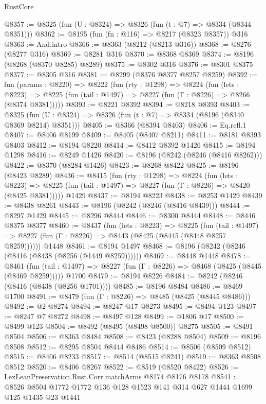 \begin{lexlean}{RustCore}
\begin{coremodule}
@8357 := @8325 (fun (U : @8324) => @8326 (fun (t : @7) => @8334 (@8344 @8351)))
@8362 := @8195 (fun (fn : @116) => @8217 (@8323 @8357)) @316
@8363 := And.intro
@8366 := @8363 (@8212 (@8213 @316))
@8368 := @8276 (@8277 @316)
@8369 := @8281 @316
@8370 := @8368 @8369
@8374 := @8196 (@8268 (@8370 @8285) @8289)
@8375 := @8302 @316
@8376 := @8301 @8375
@8377 := @8305 @316
@8381 := @8299 (@8376 @8377 @8257 @8259)
@8392 := fun (params : @8220) =>
  @8222
    (fun (rty : @1298) =>
    @8224
      (fun (lets : @8223) =>
      @8225 (fun (tail : @1497) => @8227 (fun (Γ : @8226) => @8266 (@8374 @8381)))))
@8393 := @8221 @8392
@8394 := @8218 @8393
@8403 := @8325 (fun (U : @8324) => @8326 (fun (t : @7) => @8334 (@8196 (@8340 @8369 @8214) @8351)))
@8405 := @8366 (@8394 @8403)
@8406 := Eq.refl.{1}
@8407 := @8406 @8199
@8409 := @8405 (@8407 @8211)
@8411 := @8181 @8393 @8403
@8412 := @8194 @8220
@8414 := @8412 @8392 @1426
@8415 := @8194 @1298
@8416 := @8249 @1426
@8420 := @8196 (@8242 (@8246 (@8416 @8262)))
@8422 := @8370 (@8284 @1426)
@8423 := @8268 @8422
@8425 := @8196 (@8423 @8289)
@8436 := @8415
    (fun (rty : @1298) =>
    @8224
      (fun (lets : @8223) =>
      @8225 (fun (tail : @1497) => @8227 (fun (Γ : @8226) => @8420 (@8425 @8381)))))
    @1429
@8437 := @8194 @8223
@8438 := @8253 @1429
@8439 := @8438 @8261
@8443 := @8196 (@8242 (@8246 (@8416 @8439)))
@8444 := @8297 @1429
@8445 := @8296 @8444
@8446 := @8300 @8444
@8448 := @8446 @8375 @8377
@8460 := @8437
    (fun (lets : @8223) =>
    @8225
      (fun (tail : @1497) => @8227 (fun (Γ : @8226) => @8443 (@8425 (@8445 (@8448 @8257 @8259))))))
    @1448
@8461 := @8194 @1497
@8468 := @8196 (@8242 (@8246 (@8416 (@8438 (@8256 (@1449 @8259))))))
@8469 := @8448 @1448
@8478 := @8461
    (fun (tail : @1497) => @8227 (fun (Γ : @8226) => @8468 (@8425 (@8445 (@8469 @8259)))))
    @1700
@8479 := @8194 @8226
@8484 := @8242 (@8246 (@8416 (@8438 (@8256 @1701))))
@8485 := @8196 @8484
@8486 := @8469 @1700
@8491 := @8479 (fun (Γ : @8226) => @8485 (@8425 (@8445 @8486)))
@8492 := @2 @8274
@8494 := @8247 @17 @8273
@8495 := @8494 @123
@8497 := @8247 @7 @8272
@8498 := @8497 @128
@8499 := @1806 @17
@8500 := @8499 @123
@8504 := @8492 (@8495 (@8498 @8500)) @8275
@8505 := @8491 @8504
@8506 := @8363 @8484
@8508 := @8423 (@8288 @8504)
@8509 := @8196 @8508
@8512 := @8295 @8504 @8444 @8486
@8514 := @8506 (@8509 @8512)
@8515 := @8406 @8233
@8517 := @8514 (@8515 @8241)
@8519 := @8363 @8508 @8512
@8520 := @8406 @8267
@8522 := @8519 (@8520 @8422)
@8526 := LexLeanPreservation.Rust.Corr.matchArms @8174 @8176 @8178
@8541 := @8526 @8504 @1772 @1772 @136 @128 @1523 @141 @314 @627 @1444 @1699 @125 @1435 @23 @1441

\end{coremodule}
\end{lexlean}
